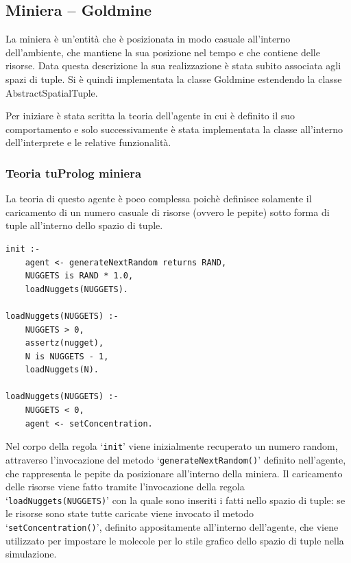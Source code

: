 \subsection{Miniera -- Goldmine}
La miniera è un'entità che è posizionata in modo casuale all'interno dell'ambiente, che mantiene la sua posizione nel tempo e che contiene delle risorse.
Data questa descrizione la sua realizzazione è stata subito associata agli spazi di tuple. Si è quindi implementata la classe Goldmine estendendo la classe AbstractSpatialTuple.

Per iniziare è stata scritta la teoria dell'agente in cui è definito il suo comportamento e solo successivamente è stata implementata la classe all'interno dell'interprete e le relative funzionalità.

\subsubsection{Teoria tuProlog miniera}
La teoria di questo agente è poco complessa poichè definisce solamente il caricamento di un numero casuale di risorse (ovvero le pepite) sotto forma di tuple all'interno dello spazio di tuple.

\switchToProlog{}
\begin{lstlisting}[float,firstnumber=1,label={lst:Goldmine},caption={Teoria miniera}]
init :-
    agent <- generateNextRandom returns RAND,
    NUGGETS is RAND * 1.0,
    loadNuggets(NUGGETS).

loadNuggets(NUGGETS) :-
    NUGGETS > 0,
    assertz(nugget),
    N is NUGGETS - 1,
    loadNuggets(N).

loadNuggets(NUGGETS) :-
    NUGGETS < 0,
    agent <- setConcentration.
\end{lstlisting}

Nel corpo della regola `\texttt{init}' viene inizialmente recuperato un numero random, attraverso l'invocazione del metodo `\texttt{generateNextRandom()}' definito nell'agente, che rappresenta le pepite da posizionare all'interno della miniera.
Il caricamento delle risorse viene fatto tramite l'invocazione della regola `\texttt{loadNuggets(NUGGETS)}' con la quale sono inseriti i fatti nello spazio di tuple: se le risorse sono state tutte caricate viene invocato il metodo `\texttt{setConcentration()}', definito appositamente all'interno dell'agente, che viene utilizzato per impostare le molecole per lo stile grafico dello spazio di tuple nella simulazione.

